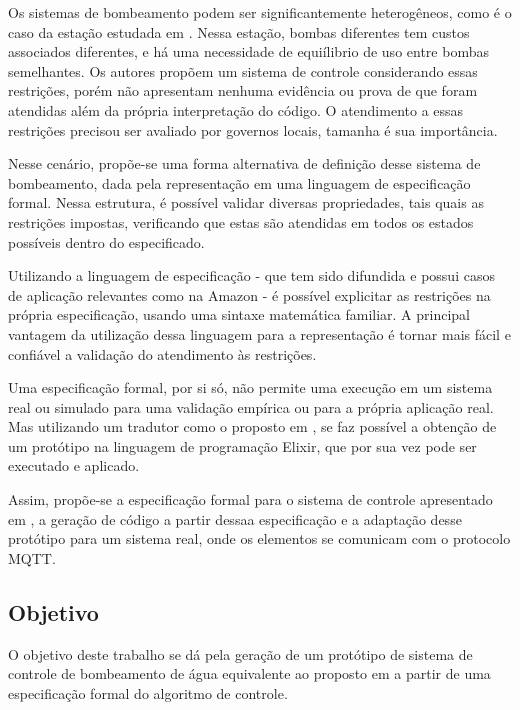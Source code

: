 \documentclass[12pt]{article}
\begin{document}
Os sistemas de bombeamento podem ser significantemente heterogêneos, como é o
caso da estação estudada em \cite{pumps}. Nessa estação, bombas diferentes tem
custos associados diferentes, e há uma necessidade de equiílibrio de uso entre
bombas semelhantes. Os autores propõem um sistema de controle considerando essas
restrições, porém não apresentam nenhuma evidência ou prova de que foram
atendidas além da própria interpretação do código. O atendimento a essas
restrições precisou ser avaliado por governos locais, tamanha é sua importância.

Nesse cenário, propõe-se uma forma alternativa de definição desse sistema de
bombeamento, dada pela representação em uma linguagem de especificação formal.
Nessa estrutura, é possível validar diversas propriedades, tais quais as
restrições impostas, verificando que estas são atendidas em todos os estados
possíveis dentro do especificado.

Utilizando a linguagem de especificação \TLA - que tem sido difundida e possui
casos de aplicação relevantes como na Amazon \cite{amazon} - é possível
explicitar as restrições na própria especificação, usando uma sintaxe matemática
familiar. A principal vantagem da utilização dessa linguagem para a
representação é tornar mais fácil e confiável a validação do atendimento às
restrições.

Uma especificação formal, por si só, não permite uma execução em um sistema real
ou simulado para uma validação empírica ou para a própria aplicação real. Mas
utilizando um tradutor como o proposto em \cite{tcc}, se faz possível a obtenção
de um protótipo na linguagem de programação Elixir, que por sua vez pode ser
executado e aplicado.

Assim, propõe-se a especificação formal para o sistema de controle apresentado
em \cite{pumps}, a geração de código a partir dessaa especificação e a adaptação
desse protótipo para um sistema real, onde os elementos se comunicam com o
protocolo MQTT.

\subsection{Objetivo}

O objetivo deste trabalho se dá pela geração de um protótipo de sistema de
controle de bombeamento de água equivalente ao proposto em \cite{pumps} a partir
de uma especificação formal do algoritmo de controle.
\end{document}
